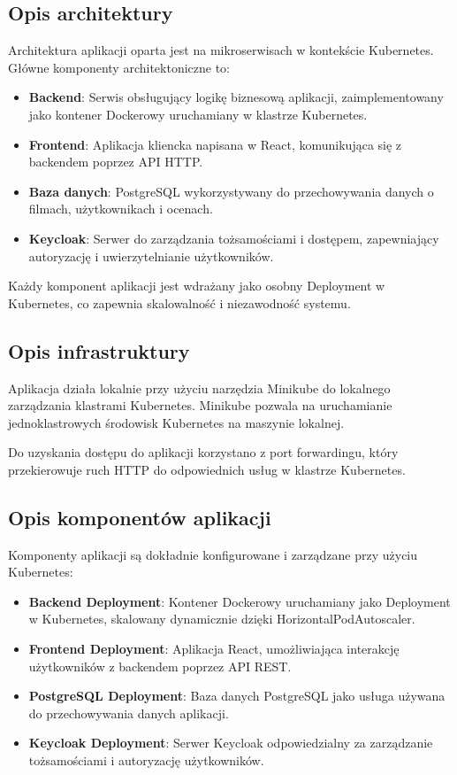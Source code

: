 \documentclass[12pt,a4paper]{article}
\begin{document}
\subsection{Opis architektury}
\label{sec:Architecture}

Architektura aplikacji oparta jest na mikroserwisach w kontekście Kubernetes. Główne komponenty architektoniczne to:

\begin{itemize}
  \item \textbf{Backend}: Serwis obsługujący logikę biznesową aplikacji, zaimplementowany jako kontener Dockerowy uruchamiany w klastrze Kubernetes.
  \item \textbf{Frontend}: Aplikacja kliencka napisana w React, komunikująca się z backendem poprzez API HTTP.
  \item \textbf{Baza danych}: PostgreSQL wykorzystywany do przechowywania danych o filmach, użytkownikach i ocenach.
  \item \textbf{Keycloak}: Serwer do zarządzania tożsamościami i dostępem, zapewniający autoryzację i uwierzytelnianie użytkowników.
\end{itemize}

Każdy komponent aplikacji jest wdrażany jako osobny Deployment w Kubernetes, co zapewnia skalowalność i niezawodność systemu.

\subsection{Opis infrastruktury}
\label{sec:Infrastructure}

Aplikacja działa lokalnie przy użyciu narzędzia Minikube do lokalnego zarządzania klastrami Kubernetes. Minikube pozwala na uruchamianie jednoklastrowych środowisk Kubernetes na maszynie lokalnej.

Do uzyskania dostępu do aplikacji korzystano z port forwardingu, który przekierowuje ruch HTTP do odpowiednich usług w klastrze Kubernetes.

\newpage
\subsection{Opis komponentów aplikacji}
\label{sec:Components}

Komponenty aplikacji są dokładnie konfigurowane i zarządzane przy użyciu Kubernetes:

\begin{itemize}
  \item \textbf{Backend Deployment}: Kontener Dockerowy uruchamiany jako Deployment w Kubernetes, skalowany dynamicznie dzięki HorizontalPodAutoscaler.
  \item \textbf{Frontend Deployment}: Aplikacja React, umożliwiająca interakcję użytkowników z backendem poprzez API REST.
  \item \textbf{PostgreSQL Deployment}: Baza danych PostgreSQL jako usługa używana do przechowywania danych aplikacji.
  \item \textbf{Keycloak Deployment}: Serwer Keycloak odpowiedzialny za zarządzanie tożsamościami i autoryzację użytkowników.
\end{itemize}
\end{document}
